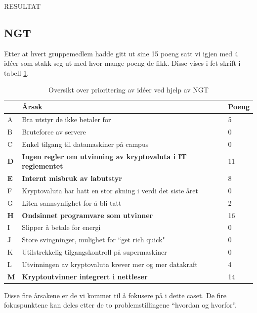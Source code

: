 RESULTAT

\subsection{NGT}
Etter at hvert gruppemedlem hadde gitt ut sine 15 poeng satt vi igjen med 4 idéer som stakk seg ut med hvor mange poeng de fikk. Disse vises i fet skrift i tabell \ref{tab:NGT}. 

\begin{table} [H]
    \begin{tabular}{ | m{2em} | m{30em} | m{3em} | }
        \hline
            \cellcolor{yellow}  & \cellcolor{yellow} \textbf{Årsak} & \cellcolor{yellow} Poeng \\
        \hline
           A& Bra utstyr de ikke betaler for & 5 \\
        \hline
          B & Bruteforce av servere & 0 \\
        \hline
          C & Enkel tilgang til datamaskiner på campus & 0 \\
        \hline
         \textbf{D} & \textbf{Ingen regler om utvinning av kryptovaluta i IT reglementet} & 11 \\
        \hline
          \textbf{E} & \textbf{Internt misbruk av labutstyr} & 8  \\
        \hline
          F & Kryptovaluta har hatt en stor økning i verdi det siste året & 0 \\
        \hline
         G & Liten sannsynlighet for å bli tatt & 2 \\
        \hline
         \textbf{H} & \textbf{Ondsinnet programvare som utvinner} &  16 \\
        \hline
         I & Slipper å betale for energi & 0 \\
        \hline
         J & Store svingninger, mulighet for “get rich quick" & 0 \\
        \hline
         K & Utilstrekkelig tilgangskontroll på supermaskiner & 0 \\
        \hline
         L & Utvinningen av kryptovaluta krever mer og mer datakraft & 4 \\
        \hline
         \textbf{M} & \textbf{Kryptoutvinner integrert i nettleser} & 14 \\
        \hline
    \end{tabular}
    \caption{Oversikt over prioritering av idéer ved hjelp av NGT}
    \label{tab:NGT}
\end{table}

Disse fire årsakene er de vi kommer til å fokusere på i dette caset. De fire fokuspunktene kan deles etter de to problemstillingene ``hvordan og hvorfor''.

